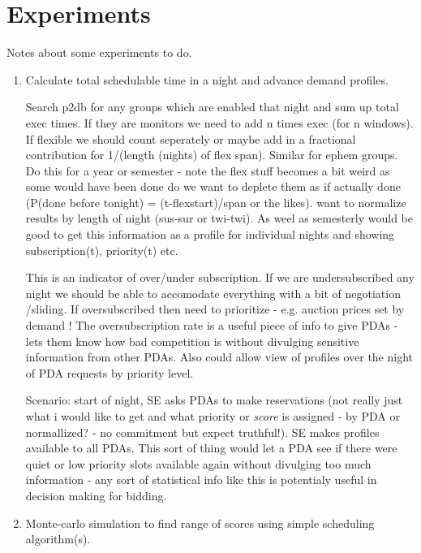 \section{Experiments}
Notes about some experiments to do.

\begin{enumerate}

\item Calculate total schedulable time in a night and advance demand profiles.

Search p2db for any groups which are enabled that night and sum up total exec times. If they are monitors we need to add n times exec (for n windows). If flexible we should count seperately or maybe add in a fractional contribution for 1/(length (nights) of flex span). Similar for ephem groups. Do this for a year or semester - note the flex stuff becomes a bit weird as some would have been done do we want to deplete them as if actually done (P(done before tonight) = (t-flexstart)/span or the likes). want to normalize results by length of night (sus-sur or twi-twi). As weel as semesterly would be good to get this information as a profile for individual nights and showing subscription(t), priority(t) etc.

This is an indicator of over/under subscription. If we are undersubscribed any night we should be able to accomodate everything with a bit of negotiation /sliding. If oversubscribed then need to prioritize - e.g. auction prices set by demand ! The oversubscription rate is a useful piece of info to give PDAs - lets them know how bad competition is without divulging sensitive information from other PDAs. Also could allow view of profiles over the night of PDA requests by priority level. 

Scenario: start of night, SE asks PDAs to make reservations (not really just what i would like to get and what priority or \emph{score} is assigned  - by PDA or normallized? - no commitment but expect truthful!). SE makes profiles available to all PDAs. This sort of thing would let a PDA see if there were quiet or low priority slots available again without divulging too much information - any sort of statistical info like this is potentialy useful in decision making for bidding. 


\item Monte-carlo simulation to find range of scores using simple scheduling algorithm(s).


\end{enumerate}
